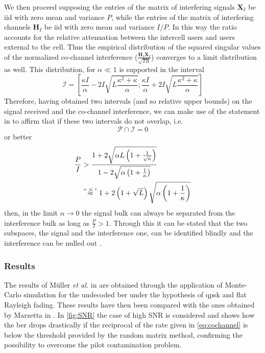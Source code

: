 \documentclass[11pt]{book}
\newcommand{\myeq}{\mathrel{\stackrel{\mbox{\normalfont\tiny{$\alpha \ll 1$}}}{\approx}}}
\begin{document}
We then proceed supposing the entries of the matrix of interfering signals $\mathbf{X}_I$ be iid with zero mean and variance $P$, while the entries of the matrix of interfering channels $\mathbf{H}_I$ be iid with zero mean and variance $I/P$. In this way the ratio accounts for the relative attenuation between the intercell users and users external to the cell. Thus the empirical distribution of the squared singular values of the normalized co-channel interference ($\frac{\mathbf{H}_I\mathbf{X}_I}{\sqrt{TR}}$) converges to a limit distribution as well. This distribution, for $\alpha \ll 1$ is supported in the interval
\begin{equation}
  \mathcal{I} =  \left[\frac{\kappa I}{\alpha}-2I\sqrt{L\frac{\kappa^2 + \kappa}{\alpha}};\frac{\kappa I}{\alpha} + 2I\sqrt{L\frac{\kappa^2 + \kappa}{\alpha}}\right]
\end{equation}
Therefore, having obtained two intervals (and so relative upper bounds) on the signal received and the co-channel interference, we can make use of the statement in \cite{Ralf2012} to affirm that if these two intervals do not overlap, i.e.
\begin{equation}
  \mathcal{P}\cap \mathcal{I} = 0
\end{equation}
or better
\begin{align}
  \frac{P}{I} &> \frac{1 + 2\sqrt{\alpha L \left( 1 + \frac{1}{\sqrt{\kappa}} \right)}}{1 - 2 \sqrt{\alpha \left( 1 + \frac{1}{\kappa} \right)}}\\
  &\myeq 1 + 2 \left( 1 + \sqrt{L} \right)\sqrt{\alpha \left( 1 + \frac{1}{\kappa} \right)}
  \label{eq:cochannel}
\end{align}
then, in the limit $\alpha \rightarrow 0$ the signal bulk can always be separated from the interference bulk as long as $\frac{P}{I} > 1$. Through this it can be stated that the two subspaces, the signal and the interference one, can be identified blindly and the interference can be nulled out \cite{Ralf}.

\subsubsection{Results}
The results of M\"uller \textit{et al.} in \cite{Ralf} are obtained through the application of Monte-Carlo simulation for the undecoded \gls{ber} under the hypothesis of \gls{qpsk} and flat Rayleigh fading. These results have then been compared with the ones obtained by Marzetta in \cite{Marzetta2010}. In \autoref{fig:SNR} the case of high SNR is considered and shows how the \gls{ber} drops drastically if the reciprocal of the rate given in \ref{eq:cochannel} is below the threshold provided by the random matrix method, confirming the possibility to overcome the pilot contamination problem.
\end{document}
